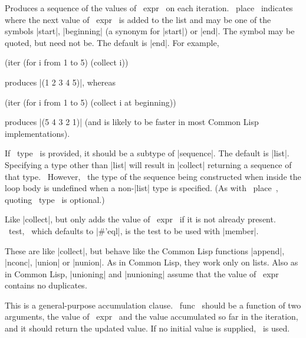 \begin{clauses}

Produces a sequence of the values of ~expr~ on each iteration. ~place~
indicates where the next value of ~expr~ is added to the list and may
be one of the symbols |start|, |beginning| (a synonym for |start|) or
|end|.  The symbol may be quoted, but need not be.  The default is
|end|.  For example,
\begin{program}
(iter (for i from 1 to 5)
      (collect i))
\end{program}
produces |(1 2 3 4 5)|, whereas
\begin{program}
(iter (for i from 1 to 5)
      (collect i at beginning))
\end{program}
produces |(5 4 3 2 1)| (and is likely to be faster in most Common Lisp
implementations).

\cpar If ~type~ is provided, it should be a subtype of |sequence|.
The default is |list|.  Specifying a type other than |list| will
result in |collect| returning a sequence of that type.  ~However,~ the
type of the sequence being constructed when inside the loop body is
undefined when a non-|list| type is specified.  (As with ~place~,
quoting ~type~ is optional.)

Like |collect|, but only adds the value of ~expr~ if it is not
already present.  ~test,~ which defaults to |\#'eql|, is
the test to be used with |member|.

\startitem
{}
\finishitem
These are like |collect|, but behave like the Common Lisp functions
|append|, |nconc|, |union| or |nunion|.  
As in Common Lisp, they work only on lists.  Also as in Common Lisp,
|unioning| and |nunioning| assume that the value of ~expr~ contains no
duplicates. 

This is a general-purpose accumulation clause. ~func~ should be a
function of two arguments, the value of ~expr~ and the value
accumulated so far in the iteration, and it should return the updated
value.  If no initial value is supplied, \nil\ is used.  


\end{clauses}

